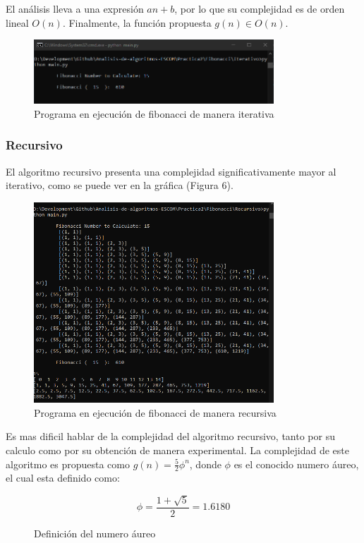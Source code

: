 \documentclass[12pt,twoside]{article}
\begin{document}
El an\'alisis lleva a una expresi\'on $an+b$, por lo que su complejidad es de orden lineal $O(n)$. Finalmente, la funci\'on propuesta $g(n) \in O(n)$.
\begin{figure}[ht]
    \centering
    \includegraphics[width = 9cm]{fibonacci_iterativo_consola.png}
    \caption{Programa en ejecuci\'on de fibonacci de manera iterativa}
    \label{fig:fibonacci_iterativo}
\end{figure}
\subsubsection{Recursivo}
El algoritmo recursivo presenta una complejidad significativamente mayor al iterativo, como se puede ver en la gr\'afica (Figura 6).
\begin{figure}[ht]
    \centering
    \includegraphics[width = 9cm]{fibonacci_recursivo_consola.png}
    \caption{Programa en ejecuci\'on de fibonacci de manera recursiva}
    \label{fig:fibonacci_recursiva}
\end{figure}
Es mas dificil hablar de la complejidad del algoritmo recursivo, tanto por su calculo como por su obtenci\'on de manera experimental. La complejidad de este algoritmo es propuesta como $g(n) = \frac{5}{2} \phi^n$, donde $\phi$ es el conocido numero \'aureo, el cual esta definido como:
\begin{figure}[ht]
    \centering
    \begin{equation}
        \phi = \frac{1 + \sqrt{5}}{2} = 1.6180
    \end{equation}
    \caption{Definici\'on del numero \'aureo}
    \label{fig:phi}
\end{figure}
\end{document}

